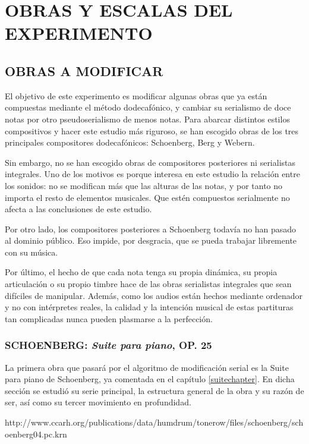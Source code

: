 	\chapter{OBRAS Y ESCALAS DEL EXPERIMENTO}
    \section{OBRAS A MODIFICAR}
    	El objetivo de este experimento es modificar algunas obras que ya están compuestas mediante el método dodecafónico, y cambiar su serialismo de doce notas por otro pseudoserialismo de menos notas. Para abarcar distintos estilos compositivos y hacer este estudio más riguroso, se han escogido obras de los tres principales compositores dodecafónicos: Schoenberg, Berg y Webern.
        
        Sin embargo, no se han escogido obras de compositores posteriores ni serialistas integrales. Uno de los motivos es porque interesa en este estudio la relación entre los sonidos: no se modifican más que las alturas de las notas, y por tanto no importa el resto de elementos musicales. Que estén compuestos serialmente no afecta a las conclusiones de este estudio.
        
        Por otro lado, los compositores posteriores a Schoenberg todavía no han pasado al dominio público. Eso impide, por desgracia, que se pueda trabajar libremente con su música.
        
        Por último, el hecho de que cada nota tenga su propia dinámica, su propia articulación o su propio timbre hace de las obras serialistas integrales que sean difíciles de manipular. Además, como los audios están hechos mediante ordenador y no con intérpretes reales, la calidad y la intención musical de estas partituras tan complicadas nunca pueden plasmarse a la perfección.
        
    	\subsection{SCHOENBERG: \textit{Suite para piano}, OP. 25}
        	La primera obra que pasará por el algoritmo de modificación serial es la Suite para piano de Schoenberg, ya comentada en el capítulo \ref{suitechapter}. En dicha sección se estudió su serie principal, la estructura general de la obra y su razón de ser, así como su tercer movimiento en profundidad.
            
            http://www.ccarh.org/publications/data/humdrum/tonerow/files/schoenberg/schoenberg04.pc.krn
            
